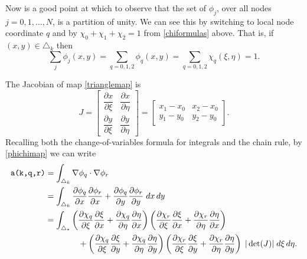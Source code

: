 Now is a good point at which to observe that the set of $\phi_j$, over all nodes $j=0,1,\dots,N$, is a partition of unity.  We can see this by switching to local node coordinate $q$ and by $\chi_0+\chi_1+\chi_2=1$ from \eqref{chiformulas} above.  That is, if $(x,y)\in\triangle_k$ then
\begin{equation}
   \sum_j \phi_j(x,y) = \sum_{q=0,1,2} \phi_q(x,y) = \sum_{q=0,1,2} \chi_q(\xi,\eta) =1.  \label{partitionofunity}
\end{equation}

The Jacobian of map \eqref{trianglemap} is
\begin{equation}
J = \begin{bmatrix}
    \dfrac{\partial x}{\partial \xi} & \dfrac{\partial x}{\partial \eta} \\[1.0em]
    \dfrac{\partial y}{\partial \xi} & \dfrac{\partial y}{\partial \eta}
    \end{bmatrix}
    =
    \begin{bmatrix}
    x_1-x_0 & x_2-x_0 \\
    y_1-y_0 & y_2-y_0
    \end{bmatrix}.  \label{trianglejacobian}
\end{equation}
Recalling both the change-of-variables formula for integrals and the chain rule, by \eqref{phichimap} we can write
\begin{align}
\text{\texttt{a(k,q,r)}} &= \int_{\triangle_k} \nabla\phi_q \cdot \nabla\phi_r \label{elementcontrib} \\
   &= \int_{\triangle_k} \frac{\partial\phi_q}{\partial x} \frac{\partial\phi_r}{\partial x} + \frac{\partial\phi_q}{\partial y} \frac{\partial\phi_r}{\partial y} \; dx \, dy  \notag \\
   &= \int_{\triangle_\ast} \left(\frac{\partial \chi_q}{\partial \xi} \frac{\partial \xi}{\partial x} + \frac{\partial \chi_q}{\partial \eta} \frac{\partial \eta}{\partial x}\right) \left(\frac{\partial \chi_r}{\partial \xi} \frac{\partial \xi}{\partial x} + \frac{\partial \chi_r}{\partial \eta} \frac{\partial \eta}{\partial x}\right) \notag \\
   &\qquad\qquad + \left(\frac{\partial \chi_q}{\partial \xi} \frac{\partial \xi}{\partial y} + \frac{\partial \chi_q}{\partial \eta} \frac{\partial \eta}{\partial y}\right) \left(\frac{\partial \chi_r}{\partial \xi} \frac{\partial \xi}{\partial y} + \frac{\partial \chi_r}{\partial \eta} \frac{\partial \eta}{\partial y}\right) \; |\det(J)| \; d\xi \, d\eta. \notag
\end{align}
